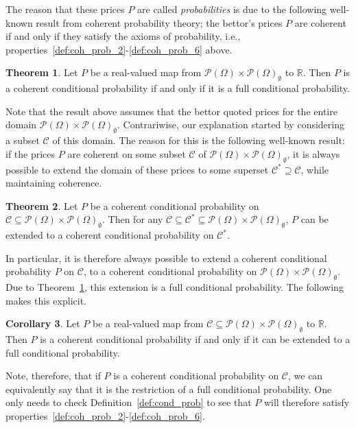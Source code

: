 \documentclass[10pt,a4paper]{paper}
\theoremstyle{definition}
\newtheorem{theorem}{Theorem}[section]
\newtheorem{corollary}[theorem]{Corollary}
\newcommand{\reals}{\mathbb{R}}
\newcommand{\paths}{\Omega}
\newcommand{\power}{\mathcal{P}(\paths)}
\newcommand{\nonemptypower}{\power_{\emptyset}}
\begin{document}
The reason that these prices $P$ are called \emph{probabilities} is due to the following well-known result from coherent probability theory; the bettor's prices $P$ are coherent if and only if they satisfy the axioms of probability, i.e., properties~\ref{def:coh_prob_2}-\ref{def:coh_prob_6} above.

\begin{theorem}{\cite[Theorem 3]{regazzini1985finitely}}\label{theo:fullcoherent}
Let $P$ be a real-valued map from $\power\times\nonemptypower$ to $\reals$. Then $P$ is a coherent conditional probability if and only if it is a full conditional probability.
\end{theorem}
Note that the result above assumes that the bettor quoted prices for the entire domain $\power\times\nonemptypower$. Contrariwise, our explanation started by considering a subset $\mathcal{C}$ of this domain. The reason for this is the following well-known result: if the prices $P$ are coherent on some subset $\mathcal{C}$ of $\power\times\nonemptypower$, it is always possible to extend the domain of these prices to some superset $\mathcal{C}^*\supseteq \mathcal{C}$, while maintaining coherence.

\begin{theorem}{\cite[Theorem 4]{regazzini1985finitely}}\label{theo:largerdomain}
Let $P$ be a coherent conditional probability on $\mathcal{C}\subseteq\power\times\nonemptypower$. Then for any $\mathcal{C}\subseteq\mathcal{C}^*\subseteq\power\times\nonemptypower$, $P$ can be extended to a coherent conditional probability on $\mathcal{C}^*$.
\end{theorem}
In particular, it is therefore always possible to extend a coherent conditional probability $P$ on $\mathcal{C}$, to a coherent conditional probability on $\power\times\nonemptypower$. Due to Theorem~\ref{theo:fullcoherent}, this extension is a full conditional probability. The following makes this explicit.

\begin{corollary}\label{corol:coherentextendable}
Let $P$ be a real-valued map from $\mathcal{C}\subseteq\power\times\nonemptypower$ to $\reals$. Then $P$ is a coherent conditional probability if and only if it can be extended to a full conditional probability.
\end{corollary}
Note, therefore, that if $P$ is a coherent conditional probability on $\mathcal{C}$, we can equivalently say that it is the restriction of a full conditional probability. One only needs to check Definition~\ref{def:cond_prob} to see that $P$ will therefore satisfy properties~\ref{def:coh_prob_2}-\ref{def:coh_prob_6}.
\end{document}
